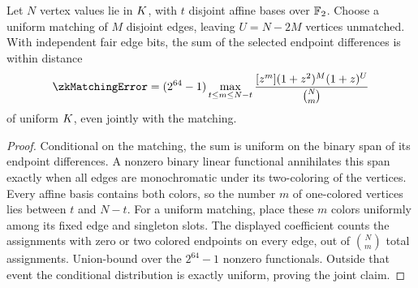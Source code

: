 \begin{lemma}\label{lem:zk-random-matching}
Let $N$ vertex values lie in $K$, with $t$ disjoint affine bases over $\mathbb{F}_2$. Choose a uniform matching of $M$ disjoint edges, leaving $U=N-2M$ vertices unmatched. With independent fair edge bits, the sum of the selected endpoint differences is within distance
\[
 \zkMatchingError
 =(2^{64}-1)\max_{t\le m\le N-t}
 \frac{[z^m](1+z^2)^M(1+z)^U}{\binom Nm}
\]
of uniform $K$, even jointly with the matching.
\end{lemma}
\begin{proof}
Conditional on the matching, the sum is uniform on the binary span of its endpoint differences. A nonzero binary linear functional annihilates this span exactly when all edges are monochromatic under its two-coloring of the vertices. Every affine basis contains both colors, so the number $m$ of one-colored vertices lies between $t$ and $N-t$. For a uniform matching, place these $m$ colors uniformly among its fixed edge and singleton slots. The displayed coefficient counts the assignments with zero or two colored endpoints on every edge, out of $\binom Nm$ total assignments. Union-bound over the $2^{64}-1$ nonzero functionals. Outside that event the conditional distribution is exactly uniform, proving the joint claim.
\end{proof}

